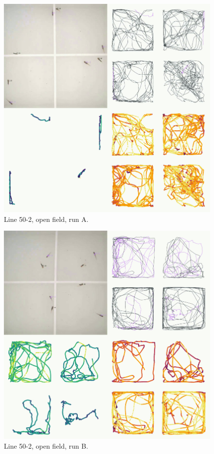 \documentclass[
]{book}
\begin{document}
\begin{figure}
\includegraphics[width=1\linewidth]{figs/mikk_behaviour/four_panel_plots/open_field_20191114_1305_50-2_R_A_300} \caption{Line 50-2, open field, run A.}\label{fig:4p-50-2-of-A}
\end{figure}



\begin{figure}
\includegraphics[width=1\linewidth]{figs/mikk_behaviour/four_panel_plots/open_field_20191116_1438_50-2_R_B_300} \caption{Line 50-2, open field, run B.}\label{fig:4p-50-2-of-B}
\end{figure}
\end{document}
